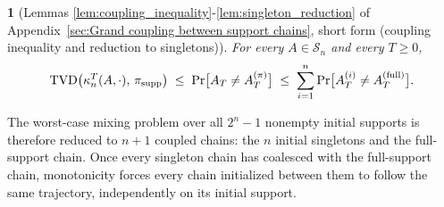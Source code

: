 \documentclass[
    aps,
    superscriptaddress,
    onecolumn,
    10pt,
    prx,
    nofootinbib
]{revtex4-2}
\theoremstyle{namedstatement}
\newtheorem*{namedstatementInner}{}
\theoremstyle{plain}
\newenvironment{restatement}[1]{%
    \begin{namedstatementInner}[#1]%
}{%
    \end{namedstatementInner}%
}
\begin{document}
\begin{restatement}{Lemmas \ref{lem:coupling_inequality}-\ref{lem:singleton_reduction} of Appendix~\ref{sec:Grand coupling between support chains}, short form (coupling inequality and reduction to singletons)}
For every $A\in\mathcal{S}_{n}$ and every $T\geq0$,
\begin{equation}\label{eq:coupling-inequality}
 \mathrm{TVD}\bigl(\kappa_{n}^{T}(A,\cdot),\,\pi_{\rm supp}\bigr)
 \;\leq\;\Pr\bigl[A_{T}\neq A_{T}^{(\pi)}\bigr]
 \;\leq\;\sum_{i=1}^{n}\Pr\bigl[A_{T}^{(i)}\neq A_{T}^{(\mathrm{full})}\bigr].
\end{equation}
\end{restatement}
The worst-case mixing problem over all $2^{n}-1$ nonempty initial supports is therefore reduced to $n+1$ coupled chains: the $n$ initial singletons and the full-support chain.  Once every singleton chain has coalesced with the full-support chain, monotonicity forces every chain initialized between them to follow the same trajectory, independently on its initial support. 
\end{document}
